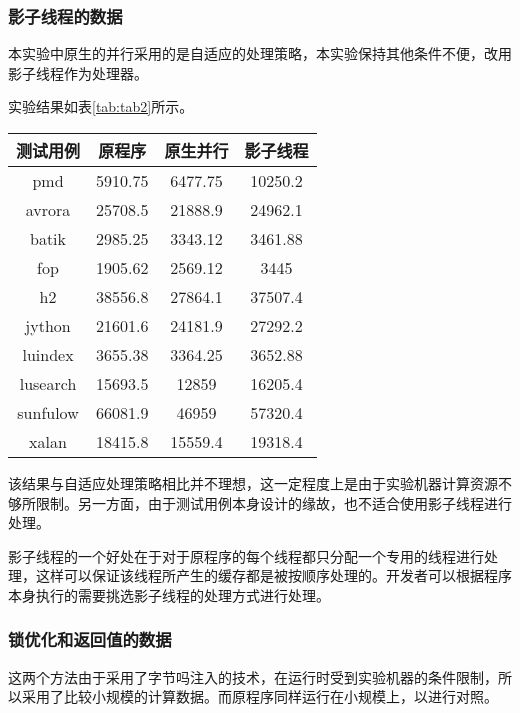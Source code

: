 \subsubsection{影子线程的数据}

本实验中原生的并行采用的是自适应的处理策略，本实验保持其他条件不便，改用影子线程作为处理器。

实验结果如表\ref{tab:tab2}所示。

\begin{table}[htbp]
	\centering
	\begin{tabular}{c|c|c|c}
		\hline
		测试用例 & 原程序 & 原生并行 & 影子线程 \\
		\hline
		pmd & 5910.75 & 6477.75 & 10250.2 \\
		\hline
		avrora & 25708.5 & 21888.9 & 24962.1 \\
		\hline
		batik & 2985.25 & 3343.12 & 3461.88 \\
		\hline
		fop & 1905.62 & 2569.12 & 3445 \\
		\hline
		h2 & 38556.8 & 27864.1 & 37507.4 \\
		\hline
		jython & 21601.6 & 24181.9 & 27292.2 \\
		\hline
		luindex & 3655.38 & 3364.25 & 3652.88 \\
		\hline
		lusearch & 15693.5 & 12859 & 16205.4 \\
		\hline
		sunfulow & 66081.9 & 46959 & 57320.4 \\
		\hline
		xalan & 18415.8 & 15559.4 & 19318.4 \\
		\hline
	\end{tabular}
\end{table}

该结果与自适应处理策略相比并不理想，这一定程度上是由于实验机器计算资源不够所限制。另一方面，由于测试用例本身设计的缘故，也不适合使用影子线程进行处理。

影子线程的一个好处在于对于原程序的每个线程都只分配一个专用的线程进行处理，这样可以保证该线程所产生的缓存都是被按顺序处理的。开发者可以根据程序本身执行的需要挑选影子线程的处理方式进行处理。

\subsubsection{锁优化和返回值的数据}

这两个方法由于采用了字节吗注入的技术，在运行时受到实验机器的条件限制，所以采用了比较小规模的计算数据。而原程序同样运行在小规模上，以进行对照。

